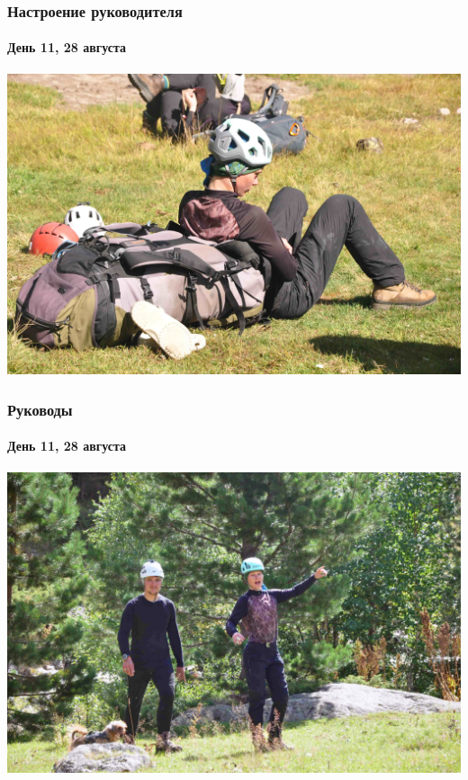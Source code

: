 \begin{frame}
	\frametitle{Настроение руководителя}
	\framesubtitle{День 11, 28 августа}	
	\centering
	\includegraphics[width=\textwidth]{../pics/DSC_0435 2}			
\end{frame}

\begin{frame}
	\frametitle{Руководы}
	\framesubtitle{День 11, 28 августа}	
	\centering
	\includegraphics[width=\textwidth]{../pics/DSC_0455 2}			
\end{frame}

